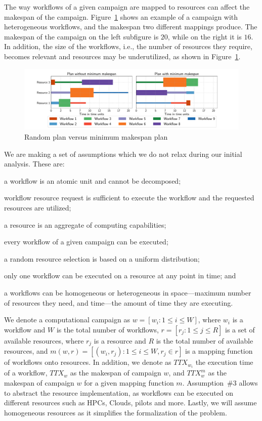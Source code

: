 The way workflows of a given campaign are mapped to resources can affect the makespan of the campaign. 
Figure~\ref{fig:example_makespan} shows an example of a campaign with heterogeneous workflows, and the makespan two different mappings produce.
The makespan of the campaign on the left subfigure is $20$, while on the right it is $16$.
In addition, the size of the workflows, i.e., the number of resources they require, becomes relevant and resources may be underutilized, as shown in Figure~\ref{fig:example_makespan}.

\begin{figure}[ht!]
    \centering
    \includegraphics[width=.95\textwidth]{figures/random_vs_specific.pdf}
    \caption{Random plan versus minimum makespan plan}\label{fig:example_makespan}
\end{figure}

We are making a set of assumptions which we do not relax during our initial analysis.
These are:
\begin{inparaenum}[(1)]
    \item a workflow is an atomic unit and cannot be decomposed;
    \item workflow resource request is sufficient to execute the workflow and the requested resources are utilized;
    \item a resource is an aggregate of computing capabilities;
    \item every workflow of a given campaign can be executed;
    \item a random resource selection is based on a uniform distribution;
    \item only one workflow can be executed on a resource at any point in time; and
    \item a workflows can be homogeneous or heterogeneous in space---maximum number of resources they need, and time---the amount of time they are executing.
\end{inparaenum}

We denote a computational campaign as $w = [w_{i}: 1 \leq i \leq W]$, where $w_{i}$ is a workflow and $W$ is the total number of workflows, $r = [ r_{j}: 1 \leq j \leq R]$ is a set of available resources, where $r_{j}$ is a resource and $R$ is the total number of available resources, and $ m(w,r) = [(w_i, r_j): 1 \leq i \leq W, r_j \in r] $ is a mapping function of workflows onto resources.
In addition, we denote as $TTX_{w_{i}}$ the execution time of a workflow, $TTX_{w}$ as the makespan of campaign $w$, and $TTX_{w}^{m}$ as the makespan of campaign $w$ for a given mapping function $ m $.
Assumption~\#3 allows to abstract the resource implementation, as workflows can be executed on different resources such as HPCs, Clouds, pilots and more. 
Lastly, we will assume homogeneous resources as it simplifies the formalization of the problem.

